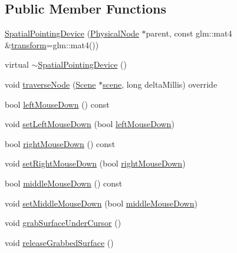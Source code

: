 \subsection*{Public Member Functions}
\begin{DoxyCompactItemize}
\item 
\hyperlink{classmotorcar_1_1SpatialPointingDevice_a5e6ae01142cf0324623fd8481ad949ea}{Spatial\-Pointing\-Device} (\hyperlink{classmotorcar_1_1PhysicalNode}{Physical\-Node} $\ast$parent, const glm\-::mat4 \&\hyperlink{classmotorcar_1_1SceneGraphNode_ad96e79fdd739ac8223a3128003be391a}{transform}=glm\-::mat4())
\item 
virtual \hyperlink{classmotorcar_1_1SpatialPointingDevice_a2232e5d48af72563948b3dcf87467ba4}{$\sim$\-Spatial\-Pointing\-Device} ()
\item 
void \hyperlink{classmotorcar_1_1SpatialPointingDevice_a53e251f5a0d7a9b0b8e7dc84d2e9d078}{traverse\-Node} (\hyperlink{classmotorcar_1_1Scene}{Scene} $\ast$\hyperlink{classmotorcar_1_1SceneGraphNode_aa14e637ed4ae98f77e28941a4b5cfdd8}{scene}, long delta\-Millis) override
\item 
bool \hyperlink{classmotorcar_1_1SpatialPointingDevice_a00473664d02c3adc6636515d328115d8}{left\-Mouse\-Down} () const 
\item 
void \hyperlink{classmotorcar_1_1SpatialPointingDevice_a8d5fb9adf62c0c808c9c08369206d47a}{set\-Left\-Mouse\-Down} (bool \hyperlink{classmotorcar_1_1SpatialPointingDevice_a00473664d02c3adc6636515d328115d8}{left\-Mouse\-Down})
\item 
bool \hyperlink{classmotorcar_1_1SpatialPointingDevice_ae419894256240b9815dd88675be03f00}{right\-Mouse\-Down} () const 
\item 
void \hyperlink{classmotorcar_1_1SpatialPointingDevice_a260a837c910d3e640df05b63b44c052e}{set\-Right\-Mouse\-Down} (bool \hyperlink{classmotorcar_1_1SpatialPointingDevice_ae419894256240b9815dd88675be03f00}{right\-Mouse\-Down})
\item 
bool \hyperlink{classmotorcar_1_1SpatialPointingDevice_aa41dd8386cb72b3813f54af4175f8bd3}{middle\-Mouse\-Down} () const 
\item 
void \hyperlink{classmotorcar_1_1SpatialPointingDevice_ac582041efeac1940a72ddc33e352101e}{set\-Middle\-Mouse\-Down} (bool \hyperlink{classmotorcar_1_1SpatialPointingDevice_aa41dd8386cb72b3813f54af4175f8bd3}{middle\-Mouse\-Down})
\item 
void \hyperlink{classmotorcar_1_1SpatialPointingDevice_ab34f8c2ab699085b5f1d78aecd961614}{grab\-Surface\-Under\-Cursor} ()
\item 
void \hyperlink{classmotorcar_1_1SpatialPointingDevice_a53cd4de170f2f69d95c9d3ee38876060}{release\-Grabbed\-Surface} ()
\end{DoxyCompactItemize}
